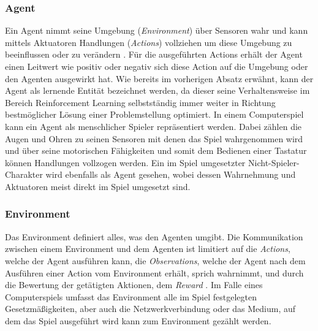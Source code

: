\documentclass[11pt]{scrartcl}
\begin{document}
\subsubsection{Agent}
Ein Agent nimmt seine Umgebung (\textit{Environment}) über Sensoren wahr und kann mittels Aktuatoren
Handlungen (\textit{Actions}) vollziehen um diese Umgebung zu beeinflussen oder zu verändern 
\cite[~S.60]{RN2009}. Für die ausgeführten Actions erhält der Agent einen Leitwert wie positiv oder
negativ sich diese Action auf die Umgebung oder den Agenten ausgewirkt hat. Wie bereits im vorherigen
Absatz erwähnt, kann der Agent als lernende Entität bezeichnet werden, da dieser seine Verhaltensweise
im Bereich  Reinforcement Learning selbstständig immer weiter in Richtung bestmöglicher Lösung einer 
Problemstellung optimiert. In einem Computerspiel kann ein Agent als menschlicher Spieler
repräsentiert werden. Dabei zählen die Augen und Ohren zu seinen Sensoren mit denen das Spiel
wahrgenommen wird und über seine motorischen Fähigkeiten und somit dem Bedienen einer Tastatur
können Handlungen vollzogen werden. Ein im Spiel umgesetzter Nicht-Spieler-Charakter wird ebenfalls
als Agent gesehen, wobei dessen Wahrnehmung und Aktuatoren meist direkt im Spiel umgesetzt sind.


\subsubsection{Environment}
Das Environment definiert alles, was den Agenten umgibt. Die Kommunikation zwischen einem Environment
und dem Agenten ist limitiert auf die \textit{Actions}, welche der Agent ausführen kann, die 
\textit{Observations}, welche der Agent nach dem Ausführen einer Action vom Environment erhält, 
sprich wahrnimmt, und durch die Bewertung der getätigten Aktionen, dem \textit{Reward} 
\cite[~S.5]{L2018}. Im Falle eines Computerspiels umfasst das Environment alle im Spiel festgelegten
Gesetzmäßigkeiten, aber auch die Netzwerkverbindung oder das Medium, auf dem das Spiel ausgeführt
wird kann zum Environment gezählt werden.
\end{document}
